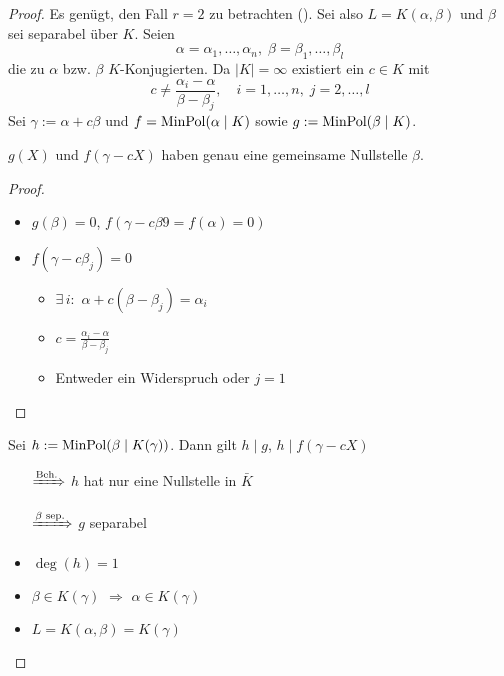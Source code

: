 \begin{proof}
	Es genügt, den Fall $r = 2$ zu betrachten (). Sei also $L = K(\alpha,\beta)$ und $\beta$ sei separabel über $K$. Seien \begin{equation*}
		\alpha = \alpha_1,\dots,\alpha_n,\;\beta = \beta_1,\dots,\beta_l
	\end{equation*}
	die zu $\alpha$ bzw. $\beta$ $K$-Konjugierten. Da $\vert K \vert = \infty$ existiert ein $c\in K$ mit \begin{equation*}
		c \neq \frac{\alpha_i - \alpha}{\beta-\beta_j},\quad i=1,\dots,n,\;j=2,\dots,l
	\end{equation*}
	Sei $\gamma := \alpha + c\beta$ und $f = \operatorname{MinPol}(\alpha\mid K)$ sowie $g := \operatorname{MinPol}(\beta\mid K)$.
	\begin{underlinedenvironment}[Behauptung]
		$g(X)$ und $f(\gamma- cX)$ haben genau eine gemeinsame Nullstelle $\beta$.
	\end{underlinedenvironment}
	\vspace*{\dimexpr-\baselineskip-2\lineskip}
	\begin{proof}\leavevmode
		\begin{itemize}[topsep=\dimexpr-6pt-\lineskip\relax]
			\item $g(\beta) = 0$, $f(\gamma - c\beta9 = f(\alpha) = 0)$
			\item $f(\gamma - c\beta_j) = 0$ \begin{itemize}[topsep=-6pt,label={$\Rightarrow$}]
				\item $\exists\,i\colon$ $\alpha + c(\beta - \beta_j) = \alpha_i$
				\item $\displaystyle c = \frac{\alpha_i - \alpha}{\beta - \beta_j}$
				\item Entweder ein Widerspruch oder $j=1$
			\end{itemize}
		\end{itemize}
	\end{proof}
	Sei $h := \operatorname{MinPol}(\beta\mid K(\gamma))$. Dann gilt $h\mid g$, $h\mid f(\gamma -cX)$ \begin{itemize}[topsep=-6pt,label={$\Rightarrow$},widest={$\xRightarrow{\text{$\beta$ sep.}}$},leftmargin=*]
		\item[$\xRightarrow{\text{Beh.}}$] $h$ hat nur eine Nullstelle in $\bar K$
		\item[$\xRightarrow{\text{$\beta$ sep.}}$] $g$ separabel
		\item $\deg(h) = 1$
		\item $\beta\in K(\gamma)$ $\Rightarrow$ $\alpha\in K(\gamma)$
		\item $L = K(\alpha,\beta) = K(\gamma)$
	\end{itemize}
\end{proof}
